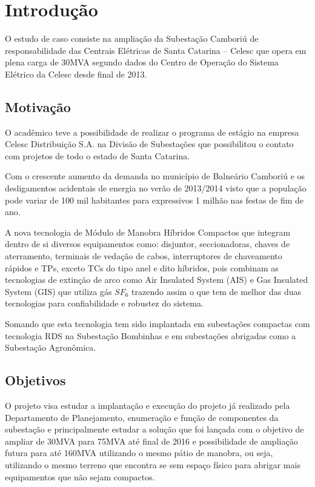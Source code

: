 \textual %

\chapter[Introdução]{Introdução} %
	O estudo de caso consiste na ampliação da Subestação Camboriú de responsabilidade das Centrais Elétricas de Santa Catarina – Celesc que opera em plena carga de 30MVA segundo dados do Centro de Operação do Sistema Elétrico da Celesc desde final de 2013.

	\section{Motivação}
		O acadêmico teve a possibilidade de realizar o programa de estágio na empresa Celesc Distribuição S.A. na Divisão de Subestações que possibilitou o contato com projetos de todo o estado de Santa Catarina. \par
		Com o crescente aumento da demanda no município de Balneário Camboriú e os desligamentos acidentais de energia no verão de 2013/2014 visto que a população pode variar de 100 mil habitantes para expressivos 1 milhão nas festas de fim de ano.\par
		A nova tecnologia de Módulo de Manobra Híbridos Compactos que integram dentro de si diversos equipamentos como: disjuntor, seccionadoras, chaves de aterramento, terminais de vedação de cabos, interruptores de chaveamento rápidos e TPs, exceto TCs do tipo anel e dito híbridos, pois combinam as tecnologias de extinção de arco como Air Insulated System (AIS) e Gas Insulated System (GIS) que utiliza gás $SF_6$ trazendo assim o que tem de melhor das duas tecnologias para confiabilidade e robustez do sistema.\par
		Somando que esta tecnologia tem sido implantada em subestações compactas com tecnologia RDS na Subestação Bombinhas e em subestações abrigadas como a Subestação Agronômica.

	\section{Objetivos}
		O projeto visa estudar a implantação e execução do projeto já realizado pela Departamento de Planejamento, enumeração e função de componentes da subestação e principalmente estudar a solução que foi lançada com o objetivo de ampliar de 30MVA para 75MVA até final de 2016 e possibilidade de ampliação futura para até 160MVA utilizando o mesmo pátio de manobra, ou seja, utilizando o mesmo terreno que encontra se sem espaço físico para abrigar mais equipamentos que não sejam compactos.

